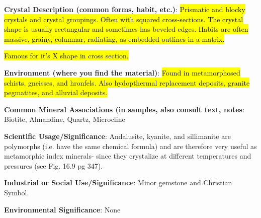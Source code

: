 \documentclass[10pt]{article}
\begin{document}
\begin{framed}
  \textbf{Crystal Description (common forms, habit, etc.)}: \hl{Prismatic and blocky crystals and crystal groupings. Often with squared cross-sections. The crystal shape is usually rectangular and sometimes has beveled edges. Habits are often massive, grainy, columnar, radiating, as embedded outlines in a matrix.}

\hl{Famous for it's X shape in cross section.}
\end{framed}

\begin{framed}
  \textbf{Environment (where you find the material)}: \hl{Found in metamorphosed schists, gneisses, and hronfels. Also hydopthermal replacement deposits, granite pegmatites, and alluvial deposits.}
\end{framed}

\begin{framed}
  \textbf{Common Mineral Associations (in samples, also consult text, notes}: Biotite, Almandine, Quartz, Microcline
\end{framed}

\begin{framed}
  \textbf{Scientific Usage/Significance}: Andalusite, kyanite, and sillimanite are polymorphs (i.e. have the same chemical formula) and are therefore very useful as metamorphic index minerals- since they crystalize at different temperatures and pressures (see Fig. 16.9 pg 347).
\end{framed}

\begin{framed}
  \textbf{Industrial or Social Use/Significance}: Minor gemstone and Christian Symbol.
\end{framed}

\begin{framed}
  \textbf{Environmental Significance}: None
\end{framed}

\end{document}
